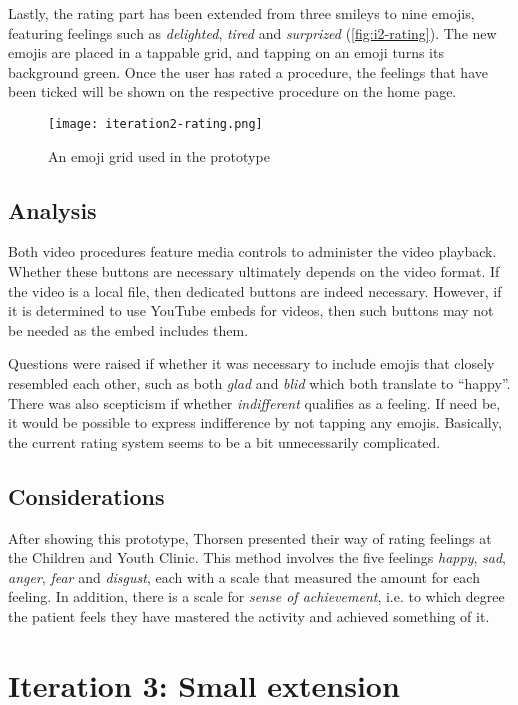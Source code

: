 Lastly, the rating part has been extended from three smileys to nine emojis, featuring feelings such as \emph{delighted}, \emph{tired} and \emph{surprized} (\autoref{fig:i2-rating}). The new emojis are placed in a tappable grid, and tapping on an emoji turns its background green. Once the user has rated a procedure, the feelings that have been ticked will be shown on the respective procedure on the home page.

\begin{figure}
    \centering
    \texttt{[image: iteration2-rating.png]}
    \caption{An emoji grid used in the prototype}
    \label{fig:i2-rating}
\end{figure}

\subsection{Analysis}

Both video procedures feature media controls to administer the video playback. Whether these buttons are necessary ultimately depends on the video format. If the video is a local file, then dedicated buttons are indeed necessary. However, if it is determined to use YouTube embeds for videos, then such buttons may not be needed as the embed includes them.

Questions were raised if whether it was necessary to include emojis that closely resembled each other, such as both \emph{glad} and \emph{blid} which both translate to \enquote{happy}. There was also scepticism if whether \emph{indifferent} qualifies as a feeling. If need be, it would be possible to express indifference by not tapping any emojis. Basically, the current rating system seems to be a bit unnecessarily complicated.

\subsection{Considerations}

After showing this prototype, Thorsen presented their way of rating feelings at the Children and Youth Clinic. This method involves the five feelings \emph{happy}, \emph{sad}, \emph{anger}, \emph{fear} and \emph{disgust}, each with a scale that measured the amount for each feeling. In addition, there is a scale for \emph{sense of achievement}, i.e. to which degree the patient feels they have mastered the activity and achieved something of it.

\section{Iteration 3: Small extension}
\label{sec:iteration3}

